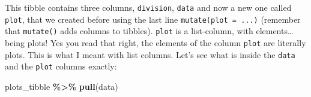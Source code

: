\documentclass[
]{article}
\newenvironment{Shaded}{\begin{snugshade}}{\end{snugshade}}
\newcommand{\KeywordTok}[1]{\textcolor[rgb]{0.13,0.29,0.53}{\textbf{#1}}}
\newcommand{\NormalTok}[1]{#1}
\newcommand{\OperatorTok}[1]{\textcolor[rgb]{0.81,0.36,0.00}{\textbf{#1}}}
\newcommand{\StringTok}[1]{\textcolor[rgb]{0.31,0.60,0.02}{#1}}
\begin{document}
This tibble contains three columns, \texttt{division}, \texttt{data} and now a new one called \texttt{plot}, that we
created before using the last line \texttt{mutate(plot\ =\ ...)} (remember that \texttt{mutate()} adds columns to
tibbles). \texttt{plot} is a list-column, with elements\ldots{} being plots! Yes you read that right, the
elements of the column \texttt{plot} are literally plots. This is what I meant with list columns.
Let's see what is inside the \texttt{data} and the \texttt{plot} columns exactly:

\begin{Shaded}
\begin{Highlighting}[]
\NormalTok{plots\_tibble }\OperatorTok{\%\textgreater{}\%}
\StringTok{  }\KeywordTok{pull}\NormalTok{(data)}
\end{Highlighting}
\end{Shaded}
\end{document}
